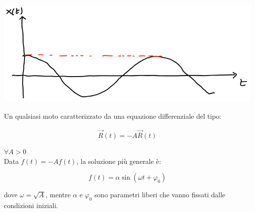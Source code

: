 \documentclass{subfiles}
\begin{document}
\includegraphics[width=\columnwidth]{esempio-moto-armonico}

\noindent
Un qualsiasi moto caratterizzato da una equazione differenziale del tipo:

$$
\ddot{\vec{R}}(t) = -A\vec{R}(t)
$$

\noindent
$\forall A > 0$\\

\noindent
Data $\ddot{f}(t) = -Af(t)$, la soluzione più generale è:

$$
f(t) = \alpha \sin{(\omega t + \varphi_0)}
$$

\noindent
dove $\omega = \sqrt{A}$, mentre $\alpha$ e $\varphi_0$ sono parametri liberi che vanno fissati dalle condizioni iniziali.
\end{document}
